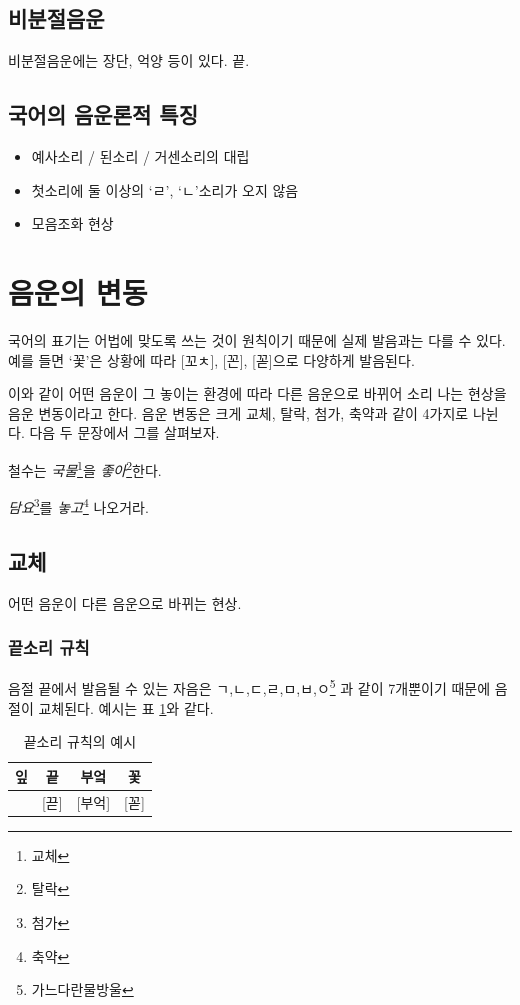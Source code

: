\documentclass[10pt]{report}
\newcommand{\tl}{\textquoteleft}
\newcommand{\tr}{\textquoteright}
\begin{document}
\subsection{비분절음운}
비분절음운에는 장단, 억양 등이 있다. 끝.

\subsection{국어의 음운론적 특징}
\begin{itemize}
\item 예사소리 / 된소리 / 거센소리의 대립
\item 첫소리에 둘 이상의 \tl ㄹ\tr, \tl ㄴ\tr 소리가 오지 않음
\item 모음조화 현상
\end{itemize}

\section{음운의 변동}
국어의 표기는 어법에 맞도록 쓰는 것이 원칙이기 때문에 실제 발음과는 다를 수 있다. 예를 들면 \tl 꽃\tr 은 상황에 따라 [꼬ㅊ], [꼰], [꼳]으로 다양하게 발음된다.

이와 같이 어떤 음운이 그 놓이는 환경에 따라 다른 음운으로 바뀌어 소리 나는 현상을 음운 변동이라고 한다. 음운 변동은 크게 교체, 탈락, 첨가, 축약과 같이 4가지로 나뉜다. 다음 두 문장에서 그를 살펴보자.

\begin{center}
	철수는 \textit{국물}\footnote{교체}을 \textit{좋아}\footnote{탈락}한다.
	
	\textit{담요}\footnote{첨가}를 \textit{놓고}\footnote{축약} 나오거라.
\end{center}

\subsection{교체}
어떤 음운이 다른 음운으로 바뀌는 현상.
\subsubsection{끝소리 규칙}
음절 끝에서 발음될 수 있는 자음은 ㄱ,ㄴ,ㄷ,ㄹ,ㅁ,ㅂ,ㅇ\footnote{가느다란물방울} 과 같이 7개뿐이기 때문에 음절이 교체된다. 예시는 표 \ref{end_sound_rule}와 같다.

\begin{table}
\begin{center}
	\begin{tabular}{|c|c|c|c|}
		\hline
		잎 & 끝 & 부엌 & 꽃 \\
		\hline
		[입] & [끋] & [부억] & [꼳] \\
		\hline
	\end{tabular}
	\caption{끝소리 규칙의 예시}
	\label{end_sound_rule}
\end{center}
\end{table}
\end{document}
